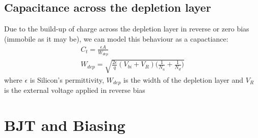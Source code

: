 \documentclass[12pt]{article}
\begin{document}
\subsection{Capacitance across the depletion layer}
Due to the build-up of charge across the depletion layer in reverse or zero bias (immobile as it may be), we can model this behaviour as a capactiance:
\begin{align}
    C_{t}=\frac{\epsilon A}{W_{dep}}\\
    W_{dep}=\sqrt{\frac{2\epsilon}{q}(V_{bi}+V_{R})\big(\frac{1}{N_a}+\frac{1}{N_d}\big)}
\end{align}
where $\epsilon$ is Silicon's permittivity, $W_{dep}$ is the width of the depletion layer and $V_R$ is the external voltage applied in reverse bias


\section{BJT and Biasing}
\end{document}

